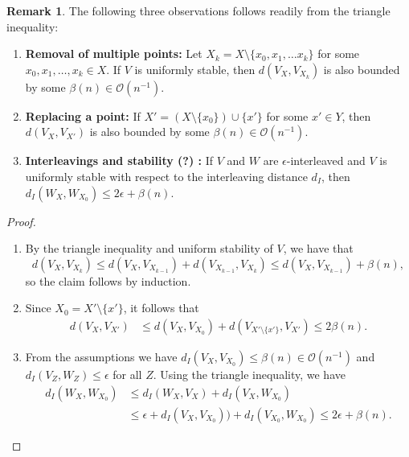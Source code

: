 \documentclass[10pt,a4paper]{article}
\theoremstyle{definition}
\newtheorem{rem}{Remark}[thm]
\begin{document}
\begin{rem}
The following three observations follows readily from the triangle inequality:
\begin{enumerate}
	\item \textbf{Removal of multiple points:} Let $X_k=X\setminus\{x_0, x_1,\ldots x_k\}$ for some  $x_0,x_1,\ldots,x_k\in X$. If $V$ is uniformly stable, then $d\left(V_X, V_{X_k}\right)$ is also bounded by some $\beta(n)\in\mathcal{O}(n^{-1})$.
	\item \textbf{Replacing a point:} If $X'=(X\setminus\{x_0\})\cup\{x'\}$ for some $x'\in Y$, then $d\left(V_X, V_{X'}\right)$ is also bounded by some $\beta(n)\in\mathcal{O}(n^{-1})$.
	\item \textbf{Interleavings and stability (?) :} If $V$ and $W$ are $\epsilon$-interleaved and $V$ is uniformly stable with respect to the interleaving distance $d_I$, then $d_I\left(W_{X}, W_{X_0}\right)\leq2\epsilon+\beta(n)$.
\end{enumerate}
\end{rem}
\begin{proof}\,
	\begin{enumerate}
		\item By the triangle inequality and uniform stability of $V$, we have that $$d(V_X, V_{X_k})\leq d(V_{X}, V_{X_{k-1}})+d(V_{X_{k-1}}, V_{X_{k}})\leq d(V_{X}, V_{X_{k-1}})+\beta(n),$$ so the claim follows by induction.
		\item Since $X_0=X'\setminus\{x'\}$, it follows that
		\begin{align*}
			d(V_X,V_{X'})&\leq d(V_X,V_{X_0})+d(V_{X'\setminus\{x'\}},V_{X'})\leq2\beta(n).%
		\end{align*}
		\item From the assumptions we have $d_I(V_X, V_{X_0}) \leq \beta(n)\in\mathcal{O}(n^{-1})$ and $d_I(V_Z, W_Z)\leq\epsilon$ for all $Z$. Using the triangle inequality, we have
		\begin{align*}
			d_I(W_X, W_{X_0}) &\leq d_I(W_X, V_X) + d_I(V_X, W_{X_0})\\
			&\leq \epsilon + d_I(V_X, V_{X_0})) + d_I(V_{X_0}, W_{X_0})\leq 2\epsilon + \beta(n).
		\end{align*}
	\end{enumerate}
\end{proof}
\end{document}
